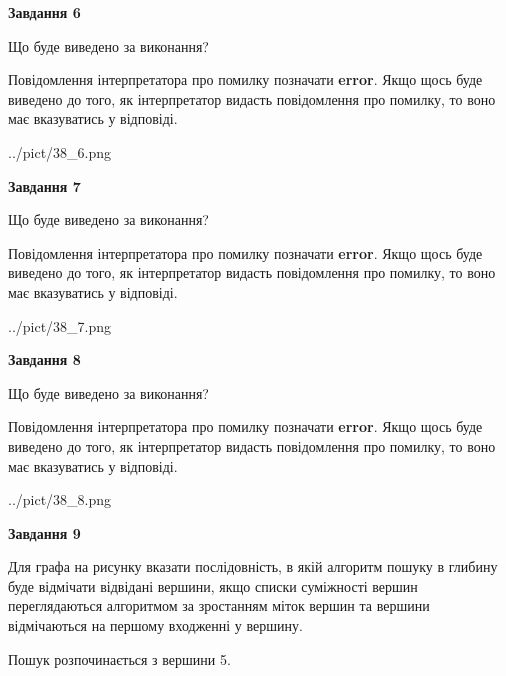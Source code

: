 \documentclass[12pt, ukrainian]{article}
\begin{document}
{\begin {large}
{\begin {center}\textbf{Завдання 6}\end {center}}\par
Що буде виведено за виконання?

Повідомлення інтерпретатора про помилку позначати \textbf{error}.
Якщо щось буде виведено до того, як інтерпретатор видасть повідомлення про помилку, 
то воно має вказуватись у відповіді. \par


\begin{center}
	{../pict/38_6.png}
\end{center}
\newpage

{\begin {center}\textbf{Завдання 7}\end {center}}\par
Що буде виведено за виконання?

Повідомлення інтерпретатора про помилку позначати \textbf{error}.
Якщо щось буде виведено до того, як інтерпретатор видасть повідомлення про помилку, 
то воно має вказуватись у відповіді. \par


\begin{center}
	{../pict/38_7.png}
\end{center}
\newpage

{\begin {center}\textbf{Завдання 8}\end {center}}\par
Що буде виведено за виконання?

Повідомлення інтерпретатора про помилку позначати \textbf{error}.
Якщо щось буде виведено до того, як інтерпретатор видасть повідомлення про помилку, 
то воно має вказуватись у відповіді. \par


\begin{center}
	{../pict/38_8.png}
\end{center}
\newpage

{\begin {center}\textbf{Завдання 9}\end {center}}\par
Для графа на рисунку вказати послідовність, в якій алгоритм пошуку в глибину буде відмічати відвідані вершини, якщо списки суміжності вершин переглядаються алгоритмом за зростанням міток вершин та вершини відмічаються на першому вход\-женні у вершину.\par
Пошук розпочинається з вершини 5.\par


\end{large}}
\end{document}
